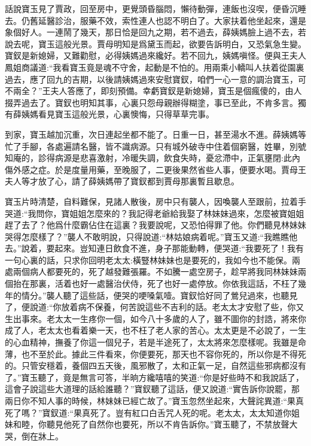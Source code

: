 


\begin{parag}
    話說寶玉見了賈政，回至房中，更覺頭昏腦悶，懶待動彈，連飯也沒喫，便昏沉睡去。仍舊延醫診治，服藥不效，索性連人也認不明白了。大家扶着他坐起來，還是象個好人。一連鬧了幾天，那日恰是回九之期，若不過去，薛姨媽臉上過不去，若說去呢，寶玉這般光景。賈母明知是爲黛玉而起，欲要告訴明白，又恐氣急生變。寶釵是新媳婦，又難勸慰，必得姨媽過來纔好。若不回九，姨媽嗔怪。便與王夫人鳳姐商議道:“我看寶玉竟是魂不守舍，起動是不怕的。用兩乘小轎叫人扶着從園裏過去，應了回九的吉期，以後請姨媽過來安慰寶釵，咱們一心一意的調治寶玉，可不兩全？”王夫人答應了，即刻預備。幸虧寶釵是新媳婦，寶玉是個瘋傻的，由人掇弄過去了。寶釵也明知其事，心裏只怨母親辦得糊塗，事已至此，不肯多言。獨有薛姨媽看見寶玉這般光景，心裏懊悔，只得草草完事。
\end{parag}


\begin{parag}
    到家，寶玉越加沉重，次日連起坐都不能了。日重一日，甚至湯水不進。薛姨媽等忙了手腳，各處遍請名醫，皆不識病源。只有城外破寺中住着個窮醫，姓畢，別號知庵的，診得病源是悲喜激射，冷暖失調，飲食失時，憂忿滯中，正氣壅閉:此內傷外感之症。於是度量用藥，至晚服了，二更後果然省些人事，便要水喝。賈母王夫人等才放了心，請了薛姨媽帶了寶釵都到賈母那裏暫且歇息。
\end{parag}


\begin{parag}
    寶玉片時清楚，自料難保，見諸人散後，房中只有襲人，因喚襲人至跟前，拉着手哭道:“我問你，寶姐姐怎麼來的？我記得老爺給我娶了林妹妹過來，怎麼被寶姐姐趕了去了？他爲什麼霸佔住在這裏？我要說呢，又恐怕得罪了他。你們聽見林妹妹哭得怎麼樣了？”襲人不敢明說，只得說道:“林姑娘病着呢。”寶玉又道:“我瞧瞧他去。”說着，要起來。豈知連日飲食不進，身子那能動轉，便哭道:“我要死了！我有一句心裏的話，只求你回明老太太:橫豎林妹妹也是要死的，我如今也不能保。兩處兩個病人都要死的，死了越發難張羅。不如騰一處空房子，趁早將我同林妹妹兩個抬在那裏，活着也好一處醫治伏侍，死了也好一處停放。你依我這話，不枉了幾年的情分。”襲人聽了這些話，便哭的哽嗓氣噎。寶釵恰好同了鶯兒過來，也聽見了，便說道:“你放着病不保養，何苦說這些不吉利的話。老太太才安慰了些，你又生出事來。老太太一生疼你一個，如今八十多歲的人了，雖不圖你的封誥，將來你成了人，老太太也看着樂一天，也不枉了老人家的苦心。太太更是不必說了，一生的心血精神，撫養了你這一個兒子，若是半途死了，太太將來怎麼樣呢。我雖是命薄，也不至於此。據此三件看來，你便要死，那天也不容你死的，所以你是不得死的。只管安穩着，養個四五天後，風邪散了，太和正氣一足，自然這些邪病都沒有了。”寶玉聽了，竟是無言可答，半晌方纔嘻嘻的笑道:“你是好些時不和我說話了，這會子說這些大道理的話給誰聽？”寶釵聽了這話，便又說道:“實告訴你說罷，那兩日你不知人事的時候，林妹妹已經亡故了。”寶玉忽然坐起來，大聲詫異道:“果真死了嗎？”寶釵道:“果真死了。豈有紅口白舌咒人死的呢。老太太，太太知道你姐妹和睦，你聽見他死了自然你也要死，所以不肯告訴你。”寶玉聽了，不禁放聲大哭，倒在牀上。
\end{parag}


